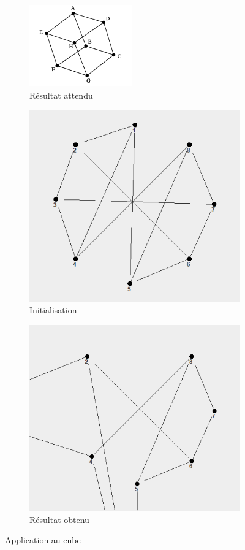 \documentclass[a4paper,12pt]{article}
\begin{document}
\begin{figure}[H]
\centering
\begin{subfigure}{.5\textwidth}
  \centering
  \includegraphics[width=.5\linewidth]{cube_des.png}
  \caption{Résultat attendu}
  \label{fig:sub3}
\end{subfigure}%

\begin{subfigure}{.5\textwidth}
  \centering
  \includegraphics[width=.5\linewidth]{cube.png}
  \caption{Initialisation}
  \label{fig:sub4}
\end{subfigure}

\begin{subfigure}{.5\textwidth}
  \centering
  \includegraphics[width=.5\linewidth]{cube_err.png}
  \caption{Résultat obtenu}
  \label{fig:sub5}
\end{subfigure}

\caption{Application au cube}
\label{fig:test}
\end{figure}
\end{document}

